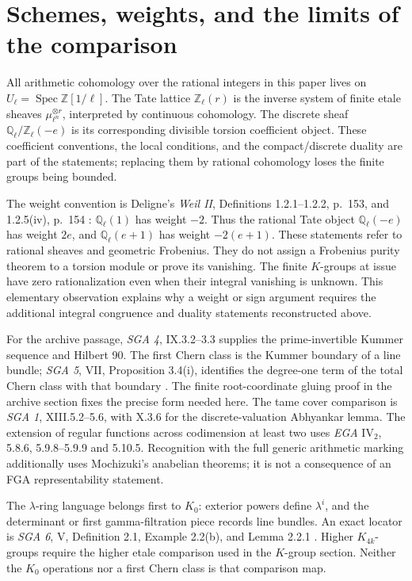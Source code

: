 \section{Schemes, weights, and the limits of the comparison}
\label{sec:framework}

All arithmetic cohomology over the rational integers in this paper lives on
$U_\ell=\operatorname{Spec}\mathbb Z[1/\ell]$. The Tate lattice
$\mathbb Z_\ell(r)$ is the inverse system of finite etale sheaves
$\mu_{\ell^n}^{\otimes r}$, interpreted by continuous cohomology.
The discrete sheaf $\mathbb Q_\ell/\mathbb Z_\ell(-e)$ is its corresponding
divisible torsion coefficient object. These coefficient conventions,
the local conditions, and the compact/discrete duality are part of the
statements; replacing them by rational cohomology loses the finite groups
being bounded.

The weight convention is Deligne's \emph{Weil II}, Definitions 1.2.1--1.2.2,
p.~153, and 1.2.5(iv), p.~154 \cite{DeligneWeilII}: $\mathbb Q_\ell(1)$ has weight $-2$.
Thus the rational Tate object $\mathbb Q_\ell(-e)$ has weight $2e$,
and $\mathbb Q_\ell(e+1)$ has weight $-2(e+1)$. These statements refer
to rational sheaves and geometric Frobenius. They do not assign a
Frobenius purity theorem to a torsion module or prove its vanishing.
The finite $K$-groups at issue have zero rationalization even when their
integral vanishing is unknown. This elementary observation explains why
a weight or sign argument requires the additional integral congruence
and duality statements reconstructed above.

For the archive passage, \emph{SGA 4}, IX.3.2--3.3 supplies the
prime-invertible Kummer sequence and Hilbert 90. The first Chern class
is the Kummer boundary of a line bundle; \emph{SGA 5}, VII,
Proposition 3.4(i), identifies the degree-one term of the total Chern
class with that boundary \cite{SGA5}. The finite root-coordinate gluing proof in
the archive section fixes the precise form needed here. The tame
cover comparison is \emph{SGA 1}, XIII.5.2--5.6, with X.3.6 for the
discrete-valuation Abhyankar lemma. The extension of regular functions
across codimension at least two uses \emph{EGA} $\mathrm{IV}_2$,
5.8.6, 5.9.8--5.9.9 and 5.10.5. Recognition with the full generic
arithmetic marking additionally uses Mochizuki's anabelian theorems;
it is not a consequence of an FGA representability statement.

The $\lambda$-ring language belongs first to $K_0$: exterior powers
define $\lambda^i$, and the determinant or first gamma-filtration
piece records line bundles. An exact locator is \emph{SGA 6}, V,
Definition 2.1, Example 2.2(b), and Lemma 2.2.1 \cite{SGA6}. Higher $K_{4k}$-groups
require the higher etale comparison used in the $K$-group section. Neither
the $K_0$ operations nor a first Chern class is that comparison map.

